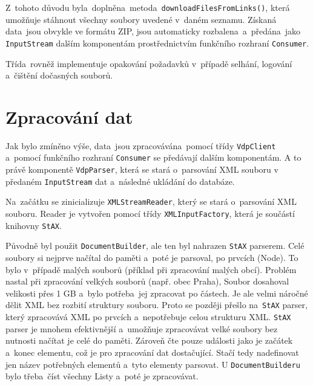 Z~tohoto důvodu byla~doplněna~metoda~\texttt{downloadFilesFromLinks()}, která umožňuje stáhnout všechny soubory uvedené v~daném seznamu.  
Získaná data~jsou obvykle ve formátu ZIP, jsou automaticky rozbalena~a~předána~jako \texttt{InputStream} dalším komponentám  
prostřednictvím funkčního rozhraní \texttt{Consumer}.  

Třída~rovněž implementuje opakování požadavků v~případě selhání, logování a~čištění dočasných souborů.

\section{Zpracování dat}
Jak bylo zmíněno výše, data~jsou zpracovávána~pomocí třídy \texttt{VdpClient} 
a~pomocí funkčního rozhraní \texttt{Consumer} se předávají dalším komponentám.
A to právě komponentě \texttt{VdpParser}, která se stará o~parsování XML souboru v předaném \texttt{InputStream} 
dat a~následné ukládání do databáze.

Na~začátku se zinicializuje \texttt{XMLStreamReader}, který se stará o~parsování XML souboru. 
Reader je vytvořen pomocí třídy \texttt{XMLInputFactory}, která je součástí \\ knihovny \texttt{StAX}.

Původně byl použit \texttt{DocumentBuilder}, ale ten byl nahrazen \texttt{StAX} parserem.
Celé soubory si nejprve načítal do paměti a~poté je parsoval, po prvcích (Node).
To bylo v~případě malých souborů (příklad při zpracování malých obcí). 
Problém nastal při zpracování velkých souborů (např. obec Praha),
Soubor dosahoval velikosti přes 1 GB a~bylo potřeba~jej zpracovat po částech.
Je ale velmi náročné dělit XML bez rozbití struktury souboru.
Proto se později přešlo na~\texttt{StAX} parser, který zpracovává XML po prvcích a~nepotřebuje celou strukturu XML.
\texttt{StAX} parser je mnohem efektivnější a~umožňuje zpracovávat velké soubory bez nutnosti načítat je celé do paměti.
Zároveň čte pouze události jako je začátek a~konec elementu, což je pro zpracování dat dostačující.
Stačí tedy nadefinovat jen název potřebných elementů a~tyto elementy parsovat.
U \texttt{DocumentBuilderu} bylo třeba~číst všechny Listy a~poté je zpracovávat.

